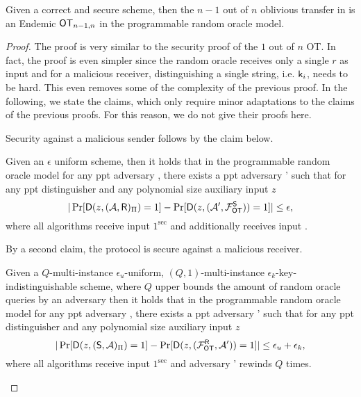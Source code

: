 \begin{lemma}\label{lem:allbutone}
Given a correct and secure \UKA scheme, then the $n-1$ out of $n$ oblivious transfer in   is an Endemic $\mathsf{OT}_{n-1,n}$ in the programmable random oracle model. 
\end{lemma}

\begin{proof}
The proof is very similar to the security proof of the $1$ out of $n$ OT. In fact, the proof is even simpler since the random oracle receives only a single $r$ as input and for a malicious receiver, distinguishing a single string, i.e. $\mathsf{k}_{i}$, needs to be hard. This even removes some of the complexity of the previous proof. In the following, we state the claims, which only require minor adaptations to the claims of the previous proofs. For this reason, we do not give their proofs here. 

Security against a malicious sender follows by the claim below. 
\begin{claim}\label{claim:malsender}
Given an $\epsilon$ uniform \UKA scheme, then it holds that in the programmable random oracle model for any ppt adversary \Adv, there exists a ppt adversary \Adv' such that for any ppt distinguisher \D and any polynomial size auxiliary input $z$
$$
|\Pr[\mathsf D(z,(\mathcal{A},\mathsf{R})_{\Pi})=1] -\Pr[\mathsf D(z, (\mathcal{A}', \mathcal{F}_{\mathsf{OT}}^\mathsf{S}))=1]|\leq \epsilon,
$$
where all algorithms receive input $1^\sec$ and \rec additionally receives input \set.
\end{claim}


By a second claim, the protocol is secure against a malicious receiver.
\begin{claim}\label{claim:malreceiver}
Given a $Q$-multi-instance $\epsilon_u$-uniform,  $(Q,1)$-multi-instance $\epsilon_k$-key-indistinguishable  \UKA scheme, where $Q$ upper bounds the amount of random oracle queries by an adversary then it holds that in the programmable random oracle model for any ppt adversary \Adv, there exists a ppt adversary \Adv' such that for any ppt distinguisher \D and any polynomial size auxiliary input $z$
$$
|\Pr[\mathsf D(z,(\mathsf{S}, \mathcal{A})_{\Pi})=1] -\Pr[\mathsf D(z,(\mathcal{F}_{\mathsf{OT}}^\mathsf{R},\mathcal{A}'))=1]|\leq \epsilon_{u}+\epsilon_{k},
$$
where all algorithms receive input $1^\sec$ and adversary \Adv' rewinds \Adv $Q$ times.
\end{claim}
\pe
\end{proof}
